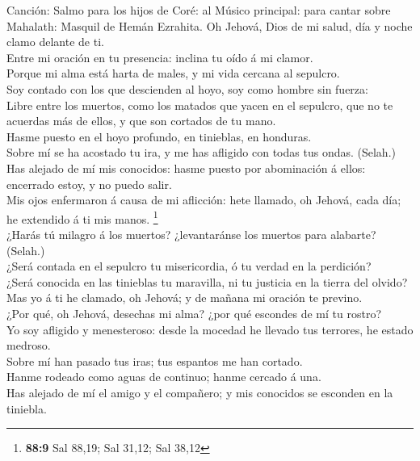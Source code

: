  Canción: Salmo para los hijos de Coré: al Músico
principal: para cantar sobre Mahalath: Masquil de Hemán Ezrahita. Oh
Jehová, Dios de mi salud, día y noche clamo delante de ti.\\
 Entre mi oración en tu presencia: inclina tu oído á mi
clamor.\\
 Porque mi alma está harta de males, y mi vida cercana al
sepulcro.\\
 Soy contado con los que descienden al hoyo, soy como
hombre sin fuerza:\\
 Libre entre los muertos, como los matados que yacen en el
sepulcro, que no te acuerdas más de ellos, y que son cortados de tu
mano.\\
 Hasme puesto en el hoyo profundo, en tinieblas, en
honduras.\\
 Sobre mí se ha acostado tu ira, y me has afligido con
todas tus ondas. (Selah.)\\
 Has alejado de mí mis conocidos: hasme puesto por
abominación á ellos: encerrado estoy, y no puedo salir.\\
 Mis ojos enfermaron á causa de mi aflicción: hete
llamado, oh Jehová, cada día; he extendido á ti mis manos. \footnote{\textbf{88:9}
  Sal 88,19; Sal 31,12; Sal 38,12}\\
 ¿Harás tú milagro á los muertos? ¿levantaránse los
muertos para alabarte? (Selah.)\\
 ¿Será contada en el sepulcro tu misericordia, ó tu
verdad en la perdición?\\
 ¿Será conocida en las tinieblas tu maravilla, ni tu
justicia en la tierra del olvido?\\
 Mas yo á ti he clamado, oh Jehová; y de mañana mi
oración te previno.\\
 ¿Por qué, oh Jehová, desechas mi alma? ¿por qué escondes
de mí tu rostro?\\
 Yo soy afligido y menesteroso: desde la mocedad he
llevado tus terrores, he estado medroso.\\
 Sobre mí han pasado tus iras; tus espantos me han
cortado.\\
 Hanme rodeado como aguas de continuo; hanme cercado á
una.\\
 Has alejado de mí el amigo y el compañero; y mis
conocidos se esconden en la tiniebla.

